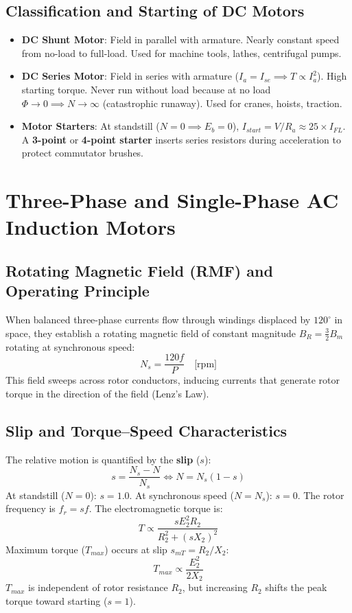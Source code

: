\subsection{Classification and Starting of DC Motors}
\begin{itemize}[leftmargin=1.5em]
    \item \textbf{DC Shunt Motor}: Field in parallel with armature. Nearly constant speed from no-load to full-load. Used for machine tools, lathes, centrifugal pumps.
    \item \textbf{DC Series Motor}: Field in series with armature ($I_a = I_{se} \implies T \propto I_a^2$). High starting torque. Never run without load because at no load $\Phi \to 0 \implies N \to \infty$ (catastrophic runaway). Used for cranes, hoists, traction.
    \item \textbf{Motor Starters}: At standstill ($N = 0 \implies E_b = 0$), $I_{start} = V / R_a \approx 25 \times I_{FL}$. A \textbf{3-point} or \textbf{4-point starter} inserts series resistors during acceleration to protect commutator brushes.
\end{itemize}

\section{Three-Phase and Single-Phase AC Induction Motors}

\subsection{Rotating Magnetic Field (RMF) and Operating Principle}
When balanced three-phase currents flow through windings displaced by $120^\circ$ in space, they establish a rotating magnetic field of constant magnitude $B_R = \frac{3}{2} B_m$ rotating at synchronous speed:
\begin{equation}
N_s = \frac{120 f}{P} \quad \text{[rpm]}
\end{equation}
This field sweeps across rotor conductors, inducing currents that generate rotor torque in the direction of the field (Lenz's Law).

\subsection{Slip and Torque--Speed Characteristics}
The relative motion is quantified by the \textbf{slip} ($s$):
\begin{equation}
s = \frac{N_s - N}{N_s} \iff N = N_s(1 - s)
\end{equation}
At standstill ($N = 0$): $s = 1.0$. At synchronous speed ($N = N_s$): $s = 0$.
The rotor frequency is $f_r = s f$. The electromagnetic torque is:
\begin{equation}
T \propto \frac{s E_2^2 R_2}{R_2^2 + (s X_2)^2}
\end{equation}
Maximum torque ($T_{max}$) occurs at slip $s_{mT} = R_2 / X_2$:
\begin{equation}
T_{max} \propto \frac{E_2^2}{2 X_2}
\end{equation}
$T_{max}$ is independent of rotor resistance $R_2$, but increasing $R_2$ shifts the peak torque toward starting ($s = 1$).

